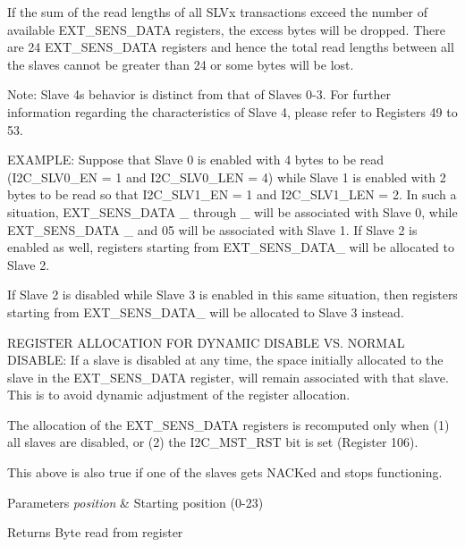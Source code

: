 If the sum of the read lengths of all S\+L\+Vx transactions exceed the number of available E\+X\+T\+\_\+\+S\+E\+N\+S\+\_\+\+D\+A\+TA registers, the excess bytes will be dropped. There are 24 E\+X\+T\+\_\+\+S\+E\+N\+S\+\_\+\+D\+A\+TA registers and hence the total read lengths between all the slaves cannot be greater than 24 or some bytes will be lost.

Note\+: Slave 4\textquotesingle{}s behavior is distinct from that of Slaves 0-\/3. For further information regarding the characteristics of Slave 4, please refer to Registers 49 to 53.

E\+X\+A\+M\+P\+LE\+: Suppose that Slave 0 is enabled with 4 bytes to be read (I2\+C\+\_\+\+S\+L\+V0\+\_\+\+EN = 1 and I2\+C\+\_\+\+S\+L\+V0\+\_\+\+L\+EN = 4) while Slave 1 is enabled with 2 bytes to be read so that I2\+C\+\_\+\+S\+L\+V1\+\_\+\+EN = 1 and I2\+C\+\_\+\+S\+L\+V1\+\_\+\+L\+EN = 2. In such a situation, E\+X\+T\+\_\+\+S\+E\+N\+S\+\_\+\+D\+A\+TA \+\_ through \+\_ will be associated with Slave 0, while E\+X\+T\+\_\+\+S\+E\+N\+S\+\_\+\+D\+A\+TA \+\_ and 05 will be associated with Slave 1. If Slave 2 is enabled as well, registers starting from E\+X\+T\+\_\+\+S\+E\+N\+S\+\_\+\+D\+A\+T\+A\+\_ will be allocated to Slave 2.

If Slave 2 is disabled while Slave 3 is enabled in this same situation, then registers starting from E\+X\+T\+\_\+\+S\+E\+N\+S\+\_\+\+D\+A\+T\+A\+\_ will be allocated to Slave 3 instead.

R\+E\+G\+I\+S\+T\+ER A\+L\+L\+O\+C\+A\+T\+I\+ON F\+OR D\+Y\+N\+A\+M\+IC D\+I\+S\+A\+B\+LE VS. N\+O\+R\+M\+AL D\+I\+S\+A\+B\+LE\+: If a slave is disabled at any time, the space initially allocated to the slave in the E\+X\+T\+\_\+\+S\+E\+N\+S\+\_\+\+D\+A\+TA register, will remain associated with that slave. This is to avoid dynamic adjustment of the register allocation.

The allocation of the E\+X\+T\+\_\+\+S\+E\+N\+S\+\_\+\+D\+A\+TA registers is recomputed only when (1) all slaves are disabled, or (2) the I2\+C\+\_\+\+M\+S\+T\+\_\+\+R\+ST bit is set (Register 106).

This above is also true if one of the slaves gets N\+A\+C\+Ked and stops functioning.


\begin{DoxyParams}{Parameters}
{\em position} & Starting position (0-\/23) \\
\hline
\end{DoxyParams}
\begin{DoxyReturn}{Returns}
Byte read from register 
\end{DoxyReturn}


